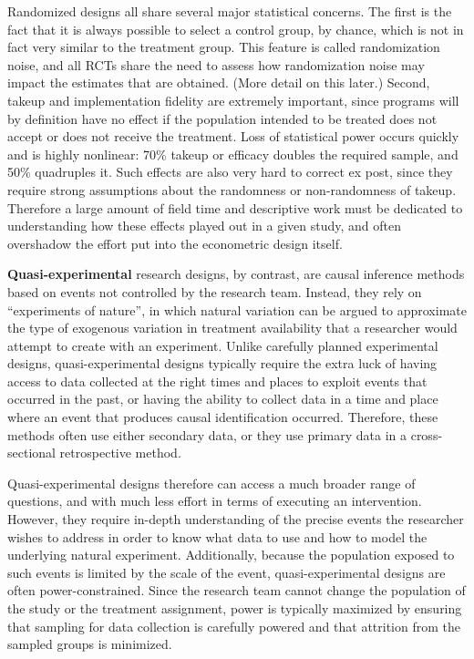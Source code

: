 Randomized designs all share several major statistical concerns.
The first is the fact that it is always possible to select a control group,
by chance, which is not in fact very similar to the treatment group.
This feature is called randomization noise, and all RCTs share the need to assess
how randomization noise may impact the estimates that are obtained.
(More detail on this later.)
Second, takeup and implementation fidelity are extremely important,
since programs will by definition have no effect
if the population intended to be treated
does not accept or does not receive the treatment.
Loss of statistical power occurs quickly and is highly nonlinear:
70\% takeup or efficacy doubles the required sample, and 50\% quadruples it.
Such effects are also very hard to correct ex post,
since they require strong assumptions about the randomness or non-randomness of takeup.
Therefore a large amount of field time and descriptive work
must be dedicated to understanding how these effects played out in a given study,
and often overshadow the effort put into the econometric design itself.

\textbf{Quasi-experimental} research designs,
by contrast, are causal inference methods based on events not controlled by the research team.
Instead, they rely on ``experiments of nature'',
in which natural variation can be argued to approximate
the type of exogenous variation in treatment availability
that a researcher would attempt to create with an experiment.\cite{dinardo2016natural}
Unlike carefully planned experimental designs,
quasi-experimental designs typically require the extra luck
of having access to data collected at the right times and places
to exploit events that occurred in the past,
or having the ability to collect data in a time and place
where an event that produces causal identification occurred.
Therefore, these methods often use either secondary data,
or they use primary data in a cross-sectional retrospective method.

Quasi-experimental designs therefore can access a much broader range of questions,
and with much less effort in terms of executing an intervention.
However, they require in-depth understanding of the precise events
the researcher wishes to address in order to know what data to use
and how to model the underlying natural experiment.
Additionally, because the population exposed
to such events is limited by the scale of the event,
quasi-experimental designs are often power-constrained.
Since the research team cannot change the population of the study
or the treatment assignment, power is typically maximized by ensuring
that sampling for data collection is carefully powered
and that attrition from the sampled groups is minimized.

